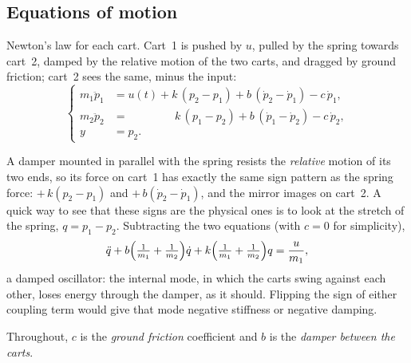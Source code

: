 \documentclass[11pt]{article}
\begin{document}
\subsection{Equations of motion}
Newton's law for each cart. Cart~1 is pushed by $u$, pulled by the spring towards
cart~2, damped by the relative motion of the two carts, and dragged by ground
friction; cart~2 sees the same, minus the input:
\begin{equation}\label{eq:eom}
\left\{
\begin{aligned}
   m_1\ddot p_1 &= u(t) + k\,(p_2-p_1) + b\,(\dot p_2-\dot p_1) - c\,\dot p_1,\\
   m_2\ddot p_2 &= \phantom{u(t)\;+{}} k\,(p_1-p_2) + b\,(\dot p_1-\dot p_2) - c\,\dot p_2,\\
   y &= p_2 .
\end{aligned}\right.
\end{equation}

\begin{remark}
A damper mounted in parallel with the spring resists the \emph{relative} motion of
its two ends, so its force on cart~1 has exactly the same sign pattern as the
spring force: $+\,k(p_2-p_1)$ and $+\,b(\dot p_2-\dot p_1)$, and the mirror images
on cart~2. A quick way to see that these signs are the physical ones is to look at
the stretch of the spring, $q=p_1-p_2$. Subtracting the two equations (with $c=0$
for simplicity),
\[
   \ddot q + b\Bigl(\tfrac1{m_1}+\tfrac1{m_2}\Bigr)\dot q
           + k\Bigl(\tfrac1{m_1}+\tfrac1{m_2}\Bigr)q = \frac{u}{m_1},
\]
a damped oscillator: the internal mode, in which the carts swing against each
other, loses energy through the damper, as it should. Flipping the sign of either
coupling term would give that mode negative stiffness or negative damping.
\end{remark}

\begin{note}[symbols]
Throughout, $c$ is the \emph{ground friction} coefficient and $b$ is the
\emph{damper between the carts}.
\end{note}
\end{document}

